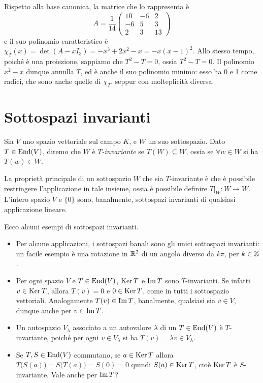 Rispetto alla base canonica, la matrice che lo rappresenta è
\begin{equation*}
	A=\frac1{14}
	\begin{pmatrix}
		10	&-6	&2\\
		-6	&5	&3\\
		2	&3	&13
	\end{pmatrix}
\end{equation*}
e il suo polinomio caratteristico è $\chi_T(x)=\det(A-xI_3)=-x^3+2x^2-x=-x(x-1)^2$.
Allo stesso tempo, poich\'e è una proiezione, sappiamo che $T^2-T=0$, ossia $T^2-T=0$.
Il polinomio $x^2-x$ dunque annulla $T$, ed è anche il suo polinomio minimo: esso ha 0 e 1 come radici, che sono anche quelle di $\chi_T$, seppur con molteplicità diversa.

\section{Sottospazi invarianti} \label{sec:sottospazi-invarianti}
\begin{definizione}\label{d:sottospazio-invariante}
	Sia $V$ uno spazio vettoriale sul campo $K$, e $W$ un suo sottospazio.
	Dato $T\in\operatorname{End}(V)$, diremo che $W$ è \emph{$T$-invariante} se $T(W)\subseteq W$, ossia se $\forall w\in W$ si ha $T(w)\in W$.
\end{definizione}
La proprietà principale di un sottospazio $W$ che sia $T$-invariante è che è possibile restringere l'applicazione in tale insieme, ossia è possibile definire $T|_W\colon W\to W$.
L'intero spazio $V$ e $\{0\}$ sono, banalmente, sottospazi invarianti di qualsiasi applicazione lineare.

Ecco alcuni esempi di sottospazi invarianti.
\begin{itemize}
	\item Per alcune applicazioni, i sottospazi banali sono gli unici sottospazi invarianti: un facile esempio è una rotazione in $\mathbb{R}^2$ di un angolo diverso da $k\pi$, per $k\in\mathbb{Z}$.
	\item Per ogni spazio $V$ e $T\in\operatorname{End}(V)$, $\operatorname{Ker} T$ e $\operatorname{Im} T$ sono $T$-invarianti.
		Se infatti $v\in\operatorname{Ker} T$, allora $T(v)=0$ e $0\in\operatorname{Ker} T$, come in tutti i sottospazio vettoriali.
		Analogamente $T(v)\in\operatorname{Im} T$, banalmente, qualsiasi sia $v\in V$, dunque anche per $v\in\operatorname{Im} T$.
	\item Un autospazio $V_\lambda$ associato a un autovalore $\lambda$ di un $T\in\operatorname{End}(V)$ è $T$-invariante, poich\'e per ogni $v\in V_\lambda$ si ha $T(v)=\lambda v\in V_\lambda$.
	\item Se $T,S\in\operatorname{End}(V)$ commutano, se $a\in\operatorname{Ker} T$ allora $T\big(S(a)\big)=S\big(T(a)\big)=S(0)=0$ quindi $S(a)\in\operatorname{Ker} T$, cioè $\operatorname{Ker} T$ è $S$-invariante.
		Vale anche per $\operatorname{Im} T$?
\end{itemize}

